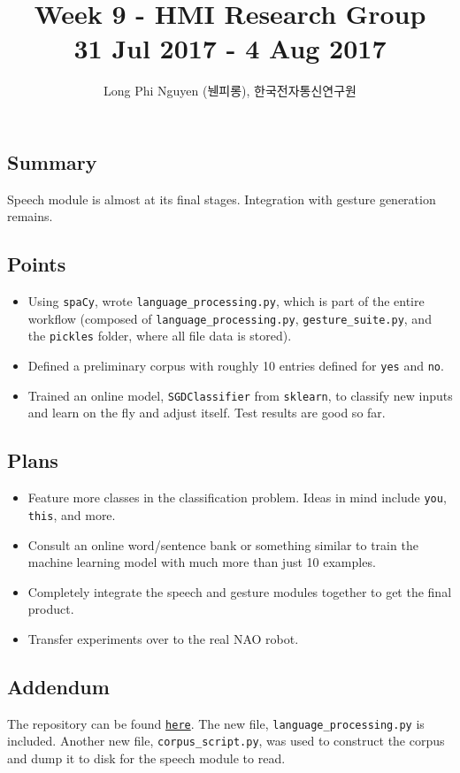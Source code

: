 \documentclass{article}
\title{Week 9 - HMI Research Group \\ \large 31 Jul 2017 - 4 Aug 2017}
\author{Long Phi Nguyen (뉀피롱), 한국전자통신연구원}
\begin{document}
  \maketitle


  \subsection*{Summary} Speech module is almost at its final stages. Integration with gesture generation remains.

  \subsection*{Points}
  \begin{itemize}
    \item Using \verb|spaCy|, wrote \verb|language_processing.py|, which is part of the entire workflow (composed of \verb|language_processing.py|, \verb|gesture_suite.py|, and the \verb|pickles| folder, where all file data is stored).
    \item Defined a preliminary corpus with roughly 10 entries defined for \verb|yes| and \verb|no|.
    \item Trained an online model, \verb|SGDClassifier| from \verb|sklearn|, to classify new inputs and learn on the fly and adjust itself. Test results are good so far.
  \end{itemize}

  \subsection*{Plans}
  \begin{itemize}
    \item Feature more classes in the classification problem. Ideas in mind include \verb|you|, \verb|this|, and more.
    \item Consult an online word/sentence bank or something similar to train the machine learning model with much more than just 10 examples.
    \item Completely integrate the speech and gesture modules together to get the final product.
    \item Transfer experiments over to the real NAO robot.
  \end{itemize}

  \subsection*{Addendum}
  The repository can be found \href{https://github.com/longnguyen1997/nao_animations}{\texttt{here}}. The new file, \verb|language_processing.py| is included. Another new file, \verb|corpus_script.py|, was used to construct the corpus and dump it to disk for the speech module to read.
\end{document}
